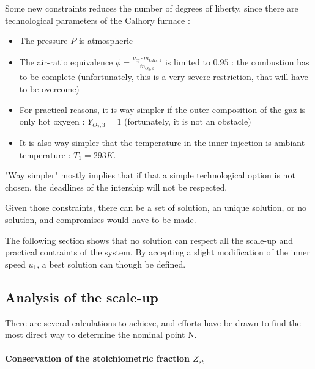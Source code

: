 Some new constraints reduces the number of degrees of liberty, since there are technological parameters of the Calhory furnace :
\begin{itemize}
\item The pressure $P$ is atmospheric
\item The air-ratio equivalence $\phi=\frac{\nu_{eq} \cdot \dot{m}_{CH_{4},1}}{\dot{m}_{O_{2},3}}$ is limited to $0.95$ : the combustion has to be complete (unfortunately, this is a very severe restriction, that will have to be overcome)
\item For practical reasons, it is way simpler if the outer composition of the gaz is only hot oxygen :  $Y_{O_{2},3}=1$ (fortunately, it is not an obstacle)
\item It is also way simpler that the temperature in the inner injection is ambiant temperature : $T_{1}=293K$.
\end{itemize}
"Way simpler" mostly implies that if that a simple technological option is not chosen, the deadlines of the intership will not be respected. 

Given those constraints, there can be a set of solution, an unique solution, or no solution, and compromises would have to be made.
 
 The following section shows that no solution can respect all the scale-up and practical contraints of the system. By accepting a slight modification of the inner speed $u_{1}$, a best solution can though be defined.
\subsection{Analysis of the scale-up}

There are several calculations to achieve, and efforts have be drawn to find the most direct way to determine the nominal point N.

\paragraph{Conservation of the stoichiometric fraction $Z_{st}$ }


